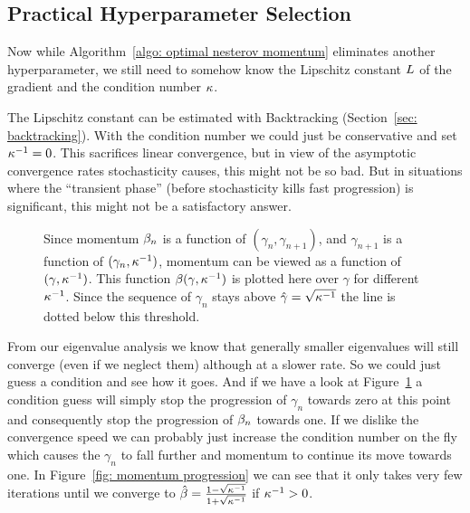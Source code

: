 \subsection{Practical Hyperparameter Selection}

Now while Algorithm~\ref{algo: optimal nesterov momentum} eliminates another
hyperparameter, we still need to somehow know the Lipschitz constant \(L\)
of the gradient and the condition number \(\kappa\).

The Lipschitz constant can be estimated with Backtracking (Section~\ref{sec:
backtracking}). With the condition number we could just be conservative and set
\(\kappa^{-1}=0\). This sacrifices linear convergence, but in view of the
asymptotic convergence rates stochasticity causes, this might not be so bad. But
in situations where the ``transient phase'' (before stochasticity kills fast
progression) is significant, this might not be a satisfactory answer.

\begin{figure}[h]
	\centering
	\def\svgwidth{1\textwidth}
	
	\caption{
		Since momentum \(\beta_n\) is a function of \((\gamma_n,
		\gamma_{n+1})\), and \(\gamma_{n+1}\) is a function of
		\((\gamma_n,\kappa^{-1})\), momentum can be viewed as a function of
		\((\gamma, \kappa^{-1})\). This function
		\(\beta(\gamma,\kappa^{-1})\) is plotted here over \(\gamma\) for
		different \(\kappa^{-1}\). Since the sequence of \(\gamma_n\) stays
		above \(\hat{\gamma}=\sqrt{\kappa^{-1}}\) the line is dotted below
		this threshold.
	}
	\label{fig: momentum gamma plot}
\end{figure}

From our eigenvalue analysis we know that generally smaller eigenvalues will
still converge (even if we neglect them) although at a slower rate. So we
could just guess a condition and see how it goes. And if we have a look at
Figure~\ref{fig: momentum gamma plot} a condition guess will simply stop the
progression of \(\gamma_n\) towards zero at this point and consequently stop the
progression of \(\beta_n\) towards one. If we dislike the convergence speed
we can probably just increase the condition number on the fly which causes the
\(\gamma_n\) to fall further and momentum to continue its move towards one.
In Figure~\ref{fig: momentum progression} we can see that it only takes very
few iterations until we converge to
\(\hat{\beta}=\frac{1-\sqrt{\kappa^{-1}}}{1+\sqrt{\kappa^{-1}}}\)
if \(\kappa^{-1}>0\).

